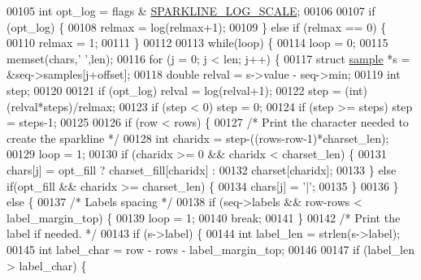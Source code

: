 \begin{DoxyCode}
00105     \textcolor{keywordtype}{int} opt\_log = flags & \hyperlink{sparkline_8h_a7b27f202623ced94e764ea1448080a25}{SPARKLINE\_LOG\_SCALE};
00106 
00107     \textcolor{keywordflow}{if} (opt\_log) \{
00108         relmax = log(relmax+1);
00109     \} \textcolor{keywordflow}{else} \textcolor{keywordflow}{if} (relmax == 0) \{
00110         relmax = 1;
00111     \}
00112 
00113     \textcolor{keywordflow}{while}(loop) \{
00114         loop = 0;
00115         memset(chars,\textcolor{stringliteral}{' '},len);
00116         \textcolor{keywordflow}{for} (j = 0; j < len; j++) \{
00117             \textcolor{keyword}{struct} \hyperlink{structsample}{sample} *s = &seq->samples[j+offset];
00118             \textcolor{keywordtype}{double} relval = s->value - seq->min;
00119             \textcolor{keywordtype}{int} step;
00120 
00121             \textcolor{keywordflow}{if} (opt\_log) relval = log(relval+1);
00122             step = (\textcolor{keywordtype}{int}) (relval*steps)/relmax;
00123             \textcolor{keywordflow}{if} (step < 0) step = 0;
00124             \textcolor{keywordflow}{if} (step >= steps) step = steps-1;
00125 
00126             \textcolor{keywordflow}{if} (row < rows) \{
00127                 \textcolor{comment}{/* Print the character needed to create the sparkline */}
00128                 \textcolor{keywordtype}{int} charidx = step-((rows-row-1)*charset\_len);
00129                 loop = 1;
00130                 \textcolor{keywordflow}{if} (charidx >= 0 && charidx < charset\_len) \{
00131                     chars[j] = opt\_fill ? charset\_fill[charidx] :
00132                                           charset[charidx];
00133                 \} \textcolor{keywordflow}{else} \textcolor{keywordflow}{if}(opt\_fill && charidx >= charset\_len) \{
00134                     chars[j] = \textcolor{stringliteral}{'|'};
00135                 \}
00136             \} \textcolor{keywordflow}{else} \{
00137                 \textcolor{comment}{/* Labels spacing */}
00138                 \textcolor{keywordflow}{if} (seq->labels && row-rows < label\_margin\_top) \{
00139                     loop = 1;
00140                     \textcolor{keywordflow}{break};
00141                 \}
00142                 \textcolor{comment}{/* Print the label if needed. */}
00143                 \textcolor{keywordflow}{if} (s->label) \{
00144                     \textcolor{keywordtype}{int} label\_len = strlen(s->label);
00145                     \textcolor{keywordtype}{int} label\_char = row - rows - label\_margin\_top;
00146 
00147                     \textcolor{keywordflow}{if} (label\_len > label\_char) \{

\end{DoxyCode}
